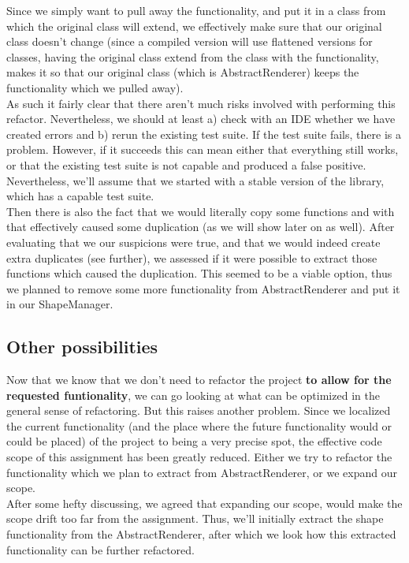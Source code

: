 \documentclass{article}
\begin{document}
Since we simply want to pull away the functionality, and put it in a class from which the original class will extend, we effectively make sure that our original class doesn't change (since a compiled version will use flattened versions for classes, having the original class extend from the class with the functionality, makes it so that our original class (which is AbstractRenderer) keeps the functionality which we pulled away).\\

As such it fairly clear that there aren't much risks involved with performing this refactor. Nevertheless, we should at least a) check with an IDE whether we have created errors and b) rerun the existing test suite. If the test suite fails, there is a problem. However, if it succeeds this can mean either that everything still works, or that the existing test suite is not capable and produced a false positive. Nevertheless, we'll assume that we started with a stable version of the library, which has a capable test suite.\\

\noindent
Then there is also the fact that we would literally copy some functions and with that effectively caused some duplication (as we will show later on as well). After evaluating that we our suspicions were true, and that we would indeed create extra duplicates (see further), we assessed if it were possible to extract those functions which caused the duplication. This seemed to be a viable option, thus we planned to remove some more functionality from AbstractRenderer and put it in our ShapeManager.


\subsection{Other possibilities}

Now that we know that we don't need to refactor the project \textbf{to allow for the requested funtionality}, we can go looking at what can be optimized in the general sense of refactoring. But this raises another problem. Since we localized the current functionality (and the place where the future functionality would or could be placed) of the project to being a very precise spot, the effective code scope of this assignment has been greatly reduced. Either we try to refactor the functionality which we plan to extract from AbstractRenderer, or we expand our scope.\\

After some hefty discussing, we agreed that expanding our scope, would make the scope drift too far from the assignment. Thus, we'll initially extract the shape functionality from the AbstractRenderer, after which we look how this extracted functionality can be further refactored.
\end{document}
